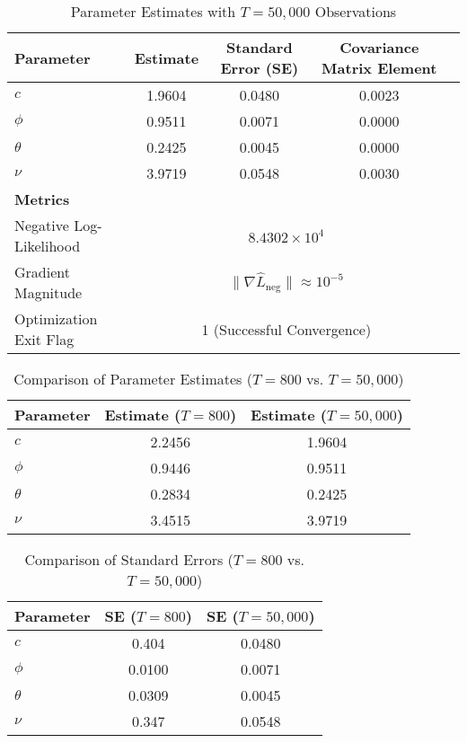 \documentclass[a4paper,12pt]{article}
\begin{document}
\begin{table}[h!]
\centering
\caption{Parameter Estimates with \( T = 50,000 \) Observations}
\label{tab:results_large_sample}
\begin{tabular}{@{}lcccc@{}}
\toprule
\textbf{Parameter} & \textbf{Estimate} & \textbf{Standard Error (SE)} & \textbf{Covariance Matrix Element} \\ \midrule
$c$      & 1.9604  & 0.0480  & 0.0023  \\
$\phi$   & 0.9511  & 0.0071  & 0.0000  \\
$\theta$ & 0.2425  & 0.0045  & 0.0000  \\
$\nu$    & 3.9719  & 0.0548  & 0.0030  \\ \midrule
\textbf{Metrics} & \multicolumn{3}{c}{} \\ \midrule
Negative Log-Likelihood & \multicolumn{3}{c}{$8.4302 \times 10^4$} \\
Gradient Magnitude      & \multicolumn{3}{c}{$\|\nabla \hat{L}_{\text{neg}}\| \approx 10^{-5}$} \\
Optimization Exit Flag  & \multicolumn{3}{c}{1 (Successful Convergence)} \\ \bottomrule
\end{tabular}
\end{table}

\begin{table}[h!]
\centering
\caption{Comparison of Parameter Estimates (\( T = 800 \) vs. \( T = 50,000 \))}
\label{tab:param_estimates_comparison}
\begin{tabular}{@{}lcc@{}}
\toprule
\textbf{Parameter} & \textbf{Estimate (\( T = 800 \))} & \textbf{Estimate (\( T = 50,000 \))} \\ \midrule
$c$      & 2.2456  & 1.9604  \\
$\phi$   & 0.9446  & 0.9511  \\
$\theta$ & 0.2834  & 0.2425  \\
$\nu$    & 3.4515  & 3.9719  \\ \bottomrule
\end{tabular}
\end{table}

\begin{table}[h!]
\centering
\caption{Comparison of Standard Errors (\( T = 800 \) vs. \( T = 50,000 \))}
\label{tab:std_errors_comparison}
\begin{tabular}{@{}lcc@{}}
\toprule
\textbf{Parameter} & \textbf{SE (\( T = 800 \))} & \textbf{SE (\( T = 50,000 \))} \\ \midrule
$c$      & 0.404   & 0.0480  \\
$\phi$   & 0.0100  & 0.0071  \\
$\theta$ & 0.0309  & 0.0045  \\
$\nu$    & 0.347   & 0.0548  \\ \bottomrule
\end{tabular}
\end{table}
\end{document}
